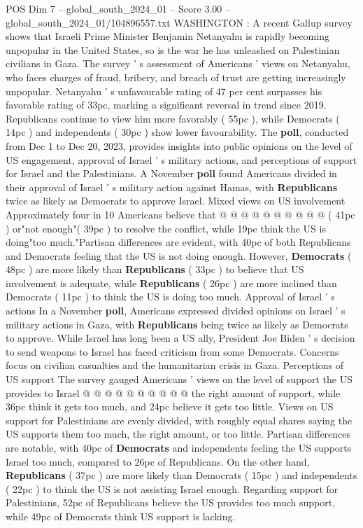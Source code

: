 \begin{textsample}{POS Dim 7 – global\_south\_2024\_01 – Score 3.00 – global\_south\_2024\_01/104896557.txt}  \label{ex:f7_pos_315}
WASHINGTON : A recent Gallup survey shows that Israeli Prime Minister Benjamin Netanyahu is rapidly becoming unpopular in the United States, so is the war he has unleashed on Palestinian civilians in Gaza.
The survey ' s assessment of Americans ' views on Netanyahu, who faces charges of fraud, bribery, and breach of trust are getting increasingly unpopular.
Netanyahu ' s unfavourable rating of 47 per cent surpasses his favorable rating of 33pc, marking a significant reversal in trend since 2019.
Republicans continue to view him more favorably ( 55pc ), while Democrats ( 14pc ) and independents ( 30pc ) show lower favourability.
The \textbf{poll}, conducted from Dec 1 to Dec 20, 2023, provides insights into public opinions on the level of US engagement, approval of Israel ' s military actions, and perceptions of support for Israel and the Palestinians.
A November \textbf{poll} found Americans divided in their approval of Israel ' s military action against Hamas, with \textbf{Republicans} twice as likely as Democrats to approve Israel.
Mixed views on US involvement Approximately four in 10 Americans believe that @ @ @ @ @ @ @ @ @ @ ( 41pc ) or"not enough"( 39pc ) to resolve the conflict, while 19pc think the US is doing"too much."Partisan differences are evident, with 40pc of both Republicans and Democrats feeling that the US is not doing enough.
However, \textbf{Democrats} ( 48pc ) are more likely than \textbf{Republicans} ( 33pc ) to believe that US involvement is adequate, while \textbf{Republicans} ( 26pc ) are more inclined than Democrats ( 11pc ) to think the US is doing too much.
Approval of Israel ' s actions In a November \textbf{poll}, Americans expressed divided opinions on Israel ' s military actions in Gaza, with \textbf{Republicans} being twice as likely as Democrats to approve.
While Israel has long been a US ally, President Joe Biden ' s decision to send weapons to Israel has faced criticism from some Democrats.
Concerns focus on civilian casualties and the humanitarian crisis in Gaza.
Perceptions of US support The survey gauged Americans ' views on the level of support the US provides to Israel @ @ @ @ @ @ @ @ @ @ the right amount of support, while 36pc think it gets too much, and 24pc believe it gets too little.
Views on US support for Palestinians are evenly divided, with roughly equal shares saying the US supports them too much, the right amount, or too little.
Partisan differences are notable, with 40pc of \textbf{Democrats} and independents feeling the US supports Israel too much, compared to 26pc of Republicans.
On the other hand, \textbf{Republicans} ( 37pc ) are more likely than Democrats ( 15pc ) and independents ( 22pc ) to think the US is not assisting Israel enough.
Regarding support for Palestinians, 52pc of Republicans believe the US provides too much support, while 49pc of Democrats think US support is lacking.

\end{textsample}
